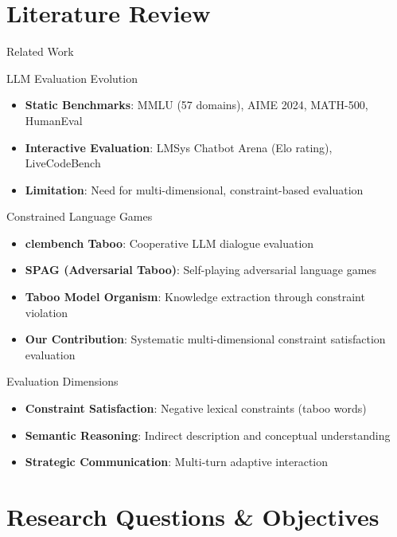 \documentclass[aspectratio=169]{beamer}
\begin{document}
\section{Literature Review}

\begin{frame}{Related Work}
\begin{block}{LLM Evaluation Evolution}
\begin{itemize}
    \item \textbf{Static Benchmarks}: MMLU (57 domains), AIME 2024, MATH-500, HumanEval
    \item \textbf{Interactive Evaluation}: LMSys Chatbot Arena (Elo rating), LiveCodeBench
    \item \textbf{Limitation}: Need for multi-dimensional, constraint-based evaluation
\end{itemize}
\end{block}

\begin{block}{Constrained Language Games}
\begin{itemize}
    \item \textbf{clembench Taboo}: Cooperative LLM dialogue evaluation
    \item \textbf{SPAG (Adversarial Taboo)}: Self-playing adversarial language games
    \item \textbf{Taboo Model Organism}: Knowledge extraction through constraint violation
    \item \textbf{Our Contribution}: Systematic multi-dimensional constraint satisfaction evaluation
\end{itemize}
\end{block}

\begin{block}{Evaluation Dimensions}
\begin{itemize}
    \item \textbf{Constraint Satisfaction}: Negative lexical constraints (taboo words)
    \item \textbf{Semantic Reasoning}: Indirect description and conceptual understanding
    \item \textbf{Strategic Communication}: Multi-turn adaptive interaction
\end{itemize}
\end{block}
\end{frame}

\section{Research Questions \& Objectives}
\end{document}
